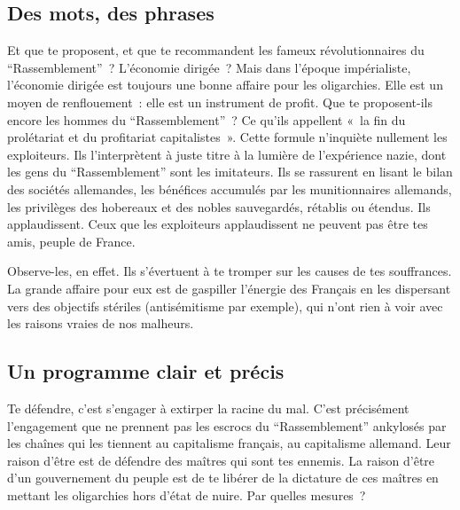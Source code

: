 \documentclass[french,twoside]{book} %
\begin{document}
\subsection[Des mots, des phrases]{Des mots, des phrases}
\noindent Et que te proposent, et que te recommandent les fameux révolutionnaires du “Rassemblement” ? L’économie dirigée ? Mais dans l’époque impérialiste, l’économie dirigée est toujours une bonne affaire pour les oligarchies. Elle est un moyen de renflouement : elle est un instrument de profit. Que te proposent-ils encore les hommes du “Rassemblement” ? Ce qu’ils appellent « la fin du prolétariat et du profitariat capitalistes ». Cette formule n’inquiète nullement les exploiteurs. Ils l’interprètent à juste titre à la lumière de l’expérience nazie, dont les gens du “Rassemblement” sont les imitateurs. Ils se rassurent en lisant le bilan des sociétés allemandes, les bénéfices accumulés par les munitionnaires allemands, les privilèges des hobereaux et des nobles sauvegardés, rétablis ou étendus. Ils applaudissent. Ceux que les exploiteurs applaudissent ne peuvent pas être tes amis, peuple de France.\par
Observe-les, en effet. Ils s’évertuent à te tromper sur les causes de tes souffrances. La grande affaire pour eux est de gaspiller l’énergie des Français en les dispersant vers des objectifs stériles (antisémitisme par exemple), qui n’ont rien à voir avec les raisons vraies de nos malheurs.
\subsection[Un programme clair et précis]{Un programme clair et précis}
\noindent Te défendre, c’est s’engager à extirper la racine du mal. C’est précisément l’engagement que ne prennent pas les escrocs du “Rassemblement” ankylosés par les chaînes qui les tiennent au capitalisme français, au capitalisme allemand. Leur raison d’être est de défendre des maîtres qui sont tes ennemis. La raison d’être d’un gouvernement du peuple est de te libérer de la dictature de ces maîtres en mettant les oligarchies hors d’état de nuire. Par quelles mesures ?\par
\end{document}
